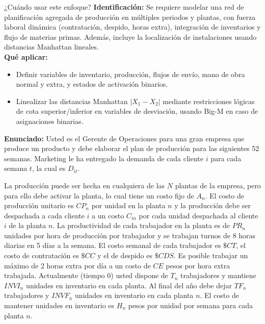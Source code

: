 \documentclass[11pt, a4paper]{article}
\begin{document}
  \begin{tipprueba}{¿Cuándo usar este enfoque?}
    \textbf{Identificación:} Se requiere modelar una red de planificación agregada de producción en múltiples periodos y plantas, con fuerza laboral dinámica (contratación, despido, horas extra), integración de inventarios y flujo de materias primas. Además, incluye la localización de instalaciones usando distancias Manhattan lineales.\\
    \textbf{Qué aplicar:}
    \begin{itemize}
      \item Definir variables de inventario, producción, flujos de envío, mano de obra normal y extra, y estados de activación binarios.
      \item Linealizar las distancias Manhattan $|X_1 - X_2|$ mediante restricciones lógicas de cota superior/inferior en variables de desviación, usando Big-M en caso de asignaciones binarias.
    \end{itemize}
  \end{tipprueba}

  \textbf{Enunciado:}
  Usted es el Gerente de Operaciones para una gran empresa que produce un producto y debe elaborar el plan de producción para las siguientes 52 semanas. Marketing le ha entregado la demanda de cada cliente $i$ para cada semana $t$, la cual es $D_{it}$.
  
  La producción puede ser hecha en cualquiera de las $N$ plantas de la empresa, pero para ello debe activar la planta, lo cual tiene un costo fijo de $A_n$. El costo de producción unitario es $CP_n$ por unidad en la planta $n$ y la producción debe ser despachada a cada cliente $i$ a un costo $C_{in}$ por cada unidad despachada al cliente $i$ de la planta $n$. La productividad de cada trabajador en la planta es de $PR_n$ unidades por hora de producción por trabajador y se trabajan turnos de 8 horas diarias en 5 días a la semana. El costo semanal de cada trabajador es $\$CT$, el costo de contratación es $\$CC$ y el de despido es $\$CDS$. Es posible trabajar un máximo de 2 horas extra por día a un costo de $CE$ pesos por hora extra trabajada. Actualmente (tiempo 0) usted dispone de $T_n$ trabajadores y mantiene $INVI_n$ unidades en inventario en cada planta. Al final del año debe dejar $TF_n$ trabajadores y $INVF_n$ unidades en inventario en cada planta $n$. El costo de mantener unidades en inventario es $H_n$ pesos por unidad por semana para cada planta $n$.
\end{document}

